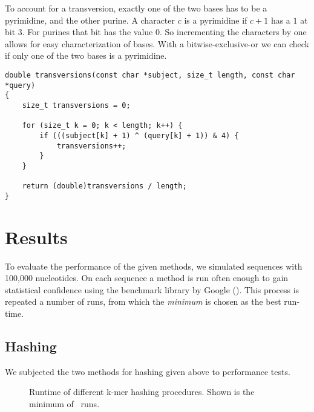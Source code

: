 \documentclass[10pt,letterpaper]{article}
\begin{document}
To account for a transversion, exactly one of the two bases has to be a pyrimidine, and the other purine. A character $c$ is a pyrimidine if $c + 1$ has a $1$ at bit 3. For purines that bit has the value $0$. So incrementing the characters by one allows for easy characterization of bases. With a bitwise-exclusive-or we can check if only one of the two bases is a pyrimidine.

\begin{lstlisting}
double transversions(const char *subject, size_t length, const char *query)
{
    size_t transversions = 0;

    for (size_t k = 0; k < length; k++) {
        if (((subject[k] + 1) ^ (query[k] + 1)) & 4) {
            transversions++;
        }
    }

    return (double)transversions / length;
}
\end{lstlisting}


\section*{Results}

To evaluate the performance of the given methods, we simulated sequences with 100{,}000 nucleotides. On each sequence a method is run often enough to gain statistical confidence using the benchmark library by Google (). This process is repeated a number of runs, from which the \emph{minimum} is chosen as the best run-time.



\subsection*{Hashing}

We subjected the two methods for hashing given above to performance tests. 


\begin{figure}
\caption{Runtime of different k-mer hashing procedures. Shown is the minimum of \gZhashZruns~runs.}
\end{figure}
\end{document}

